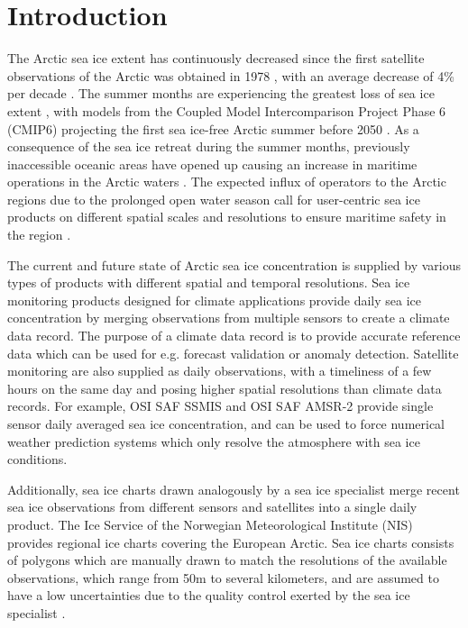 \documentclass[../main/thesis.tex]{subfiles}
\begin{document}
\section{Introduction}
\label{sec:introduction}
The Arctic sea ice extent has continuously decreased since the first satellite observations of the Arctic was obtained in 1978 \citep{Serreze2019}, with an average decrease of 4\% per decade \citep{Cavalieri2012}. The summer months are experiencing the greatest loss of sea ice extent \citep{Comiso2017}, with models from the Coupled Model Intercomparison Project Phase 6 (CMIP6) projecting the first sea ice-free Arctic summer before 2050 \citep{Notz2020}. As a consequence of the sea ice retreat during the summer months, previously inaccessible oceanic areas have opened up causing an increase in maritime operations in the Arctic waters \citep{Ho2010, Eguiluz2016}. The expected influx of operators to the Arctic regions due to the prolonged open water season call for user-centric sea ice products on different spatial scales and resolutions to ensure maritime safety in the region \citep{Wagner2020, Veland2021}.

The current and future state of Arctic sea ice concentration is supplied by various types of products with different spatial and temporal resolutions. Sea ice monitoring products designed for climate applications provide daily sea ice concentration by merging observations from multiple sensors to create a climate data record. The purpose of a climate data record is to provide accurate reference data which can be used for e.g. forecast validation or anomaly detection. Satellite monitoring are also supplied as daily observations, with a timeliness of a few hours on the same day and posing higher spatial resolutions than climate data records. For example, OSI SAF SSMIS \citep{Tonboe2017} and OSI SAF AMSR-2 \citep{Lavelle2016} provide single sensor daily averaged sea ice concentration, and can be used to force numerical weather prediction systems which only resolve the atmosphere with sea ice conditions.

Additionally, sea ice charts drawn analogously by a sea ice specialist merge recent sea ice observations from different sensors and satellites into a single daily product. The Ice Service of the Norwegian Meteorological Institute (NIS) provides regional ice charts covering the European Arctic. Sea ice charts consists of polygons which are manually drawn to match the resolutions of the available observations, which range from 50m to several kilometers, and are assumed to have a low uncertainties due to the quality control exerted by the sea ice specialist \citep{Dinessen2020}.
\end{document}
